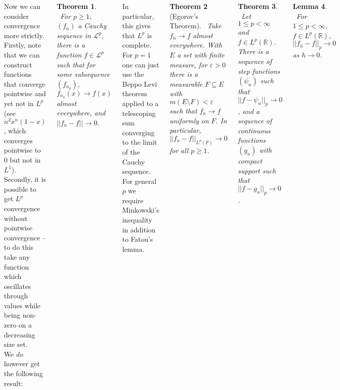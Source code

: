 \documentclass{tikzposter} %
\newtheorem{theorem}{Theorem}
\newtheorem{lemma}[theorem]{Lemma}
\begin{document}
\begin{columns}
{        Now we can consider convergence more strictly. Firstly, note that we can construct functions that converge pointwise and yet not in $L^{p}$ (see $n^{2}x^{n}(1-x)$, which converges pointwise to $0$ but not in $L^{1}$). Secondly, it is possible to get $L^{p}$ convergence without pointwise convergence -- to do this take any function which oscillates through values while being non-zero on a decreasing size set.\\

        We \emph{do} however get the following result: \\
        \begin{theorem}
        \ For $p \ge 1$, $(f_{n})$ a Cauchy sequence in $\mathcal{L}^{p}$, there is a function $f \in \mathcal{L}^{p}$ such that for some subsequence $(f_{n_{k}})$, $f_{n_{k}}(x) \to f(x)$ almost everywhere, and $||f_{n} - f|| \to 0$.
        \end{theorem}
        \hphantom{}

        In particular, this gives that $L^{p}$ is complete. \\

        For $p = 1$ one can just use the Beppo Levi theorem applied to a telescoping sum converging to the limit of the Cauchy sequence. For general $p$ we require Minkowski's inequality in addition to Fatou's lemma. \\

        \begin{theorem}[Egorov's Theorem]
        \ Take $f_{n} \to f$ almost everywhere. With $E$ a set with finite measure, for $\varepsilon > 0$ there is a measurable $F \subseteq E$ with $m(E \setminus F) < \varepsilon$ such that $f_{n} \to f$ uniformly on $F$. In particular, $||f_{n} - f||_{L^{p}(F)} \to 0$ for all $p \ge 1$.
        \end{theorem}
        \hphantom{}

        \begin{theorem}
        \ Let $1 \le p < \infty$ and $f \in L^{p}(\mathbb{R})$. There is a sequence of step functions $(\psi_{n})$ such that $||f - \psi_{n}||_{p} \to 0$, and a sequence of continuous functions $(g_{n})$ with compact support such that $||f-g_{n}||_{p} \to 0$.
        \end{theorem}
        \hphantom{}

        \begin{lemma}
        \ For $1 \le p < \infty$, $f \in L^{p}(\mathbb{R})$, $||f_{h} - f||_{p} \to 0$ as $h \to 0$.
        \end{lemma}
        \hphantom{}

}
\end{columns}
\end{document}
